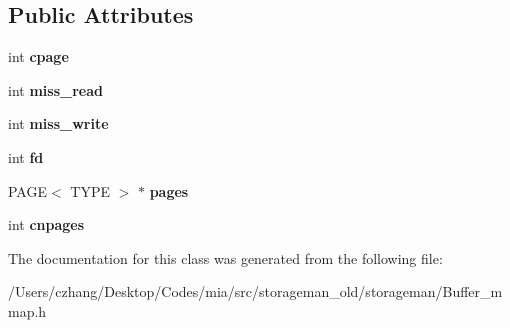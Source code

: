 \subsection*{Public Attributes}
\begin{DoxyCompactItemize}
\item 
\hypertarget{classmia_1_1sm_1_1_buffer__mmap_a4426c619759c9d3e9832c7a94b3b90b6}{int {\bfseries cpage}}\label{classmia_1_1sm_1_1_buffer__mmap_a4426c619759c9d3e9832c7a94b3b90b6}

\item 
\hypertarget{classmia_1_1sm_1_1_buffer__mmap_ad9e564fdacc8dece3dd99bb75aabc075}{int {\bfseries miss\-\_\-read}}\label{classmia_1_1sm_1_1_buffer__mmap_ad9e564fdacc8dece3dd99bb75aabc075}

\item 
\hypertarget{classmia_1_1sm_1_1_buffer__mmap_a420fcbd775fe889c4a3cdbdf12543374}{int {\bfseries miss\-\_\-write}}\label{classmia_1_1sm_1_1_buffer__mmap_a420fcbd775fe889c4a3cdbdf12543374}

\item 
\hypertarget{classmia_1_1sm_1_1_buffer__mmap_aec47baf6260d505617de2d405a97a788}{int {\bfseries fd}}\label{classmia_1_1sm_1_1_buffer__mmap_aec47baf6260d505617de2d405a97a788}

\item 
\hypertarget{classmia_1_1sm_1_1_buffer__mmap_ab49e61b9044b8c91f4cc393d70311652}{P\-A\-G\-E$<$ T\-Y\-P\-E $>$ $\ast$ {\bfseries pages}}\label{classmia_1_1sm_1_1_buffer__mmap_ab49e61b9044b8c91f4cc393d70311652}

\item 
\hypertarget{classmia_1_1sm_1_1_buffer__mmap_a1208ae10b48ad3d5746787bd1d34a424}{int {\bfseries cnpages}}\label{classmia_1_1sm_1_1_buffer__mmap_a1208ae10b48ad3d5746787bd1d34a424}

\end{DoxyCompactItemize}


The documentation for this class was generated from the following file\-:\begin{DoxyCompactItemize}
\item 
/\-Users/czhang/\-Desktop/\-Codes/mia/src/storageman\-\_\-old/storageman/Buffer\-\_\-mmap.\-h\end{DoxyCompactItemize}
